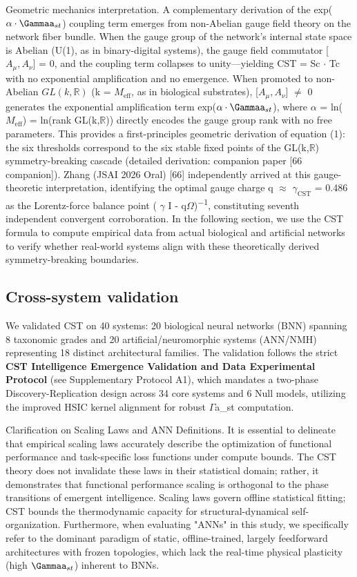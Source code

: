 \documentclass[a4paper,12pt]{article}
\begin{document}
Geometric mechanics interpretation.
A complementary derivation of the exp($\alpha \cdot \Gammaa_{st}$) coupling term emerges from non-Abelian gauge field theory on the network fiber bundle.
When the gauge group of the network's internal state space is Abelian (U(1), as in binary-digital systems), the gauge field commutator [$A_{\mu}, A_{\nu}$] = 0, and the coupling term collapses to unity---yielding CST = Sc $\cdot$ Tc with no exponential amplification and no emergence.
When promoted to non-Abelian $GL(k, \mathbb{R})$ (k = $M_{\text{eff}}$, as in biological substrates), [$A_{\mu}, A_{\nu}$]  $\neq$  0 generates the exponential amplification term exp($\alpha \cdot \Gammaa_{st}$), where  $\alpha$  = ln($M_{\text{eff}}$) = ln(rank GL(k,$\mathbb{R}$)) directly encodes the gauge group rank with no free parameters.
This provides a first-principles geometric derivation of equation (1): the six thresholds correspond to the six stable fixed points of the GL(k,$\mathbb{R}$) symmetry-breaking cascade (detailed derivation: companion paper [66 companion]).
Zhang (JSAI 2026 Oral) [66] independently arrived at this gauge-theoretic interpretation, identifying the optimal gauge charge q  $\approx$  $\gamma_{\text{CST}}$ = 0.486 as the Lorentz-force balance point ( $\gamma$ I - q$\Omega$)\textsuperscript{$-$}\textsuperscript{1}, constituting seventh independent convergent corroboration.
In the following section, we use the CST formula to compute empirical data from actual biological and artificial networks to verify whether real-world systems align with these theoretically derived symmetry-breaking boundaries.

\subsection{Cross-system validation}

We validated CST on 40 systems: 20 biological neural networks (BNN) spanning 8 taxonomic grades and 20 artificial/neuromorphic systems (ANN/NMH) representing 18 distinct architectural families.
The validation follows the strict \textbf{CST Intelligence Emergence Validation and Data Experimental Protocol} (see Supplementary Protocol A1), which mandates a two-phase Discovery-Replication design across 34 core systems and 6 Null models, utilizing the improved HSIC kernel alignment for robust $\Gamma$a_{st} computation.

Clarification on Scaling Laws and ANN Definitions.
It is essential to delineate that empirical scaling laws accurately describe the optimization of functional performance and task-specific loss functions under compute bounds.
The CST theory does not invalidate these laws in their statistical domain; rather, it demonstrates that functional performance scaling is orthogonal to the phase transitions of emergent intelligence.
Scaling laws govern offline statistical fitting; CST bounds the thermodynamic capacity for structural-dynamical self-organization.
Furthermore, when evaluating "ANNs" in this study, we specifically refer to the dominant paradigm of static, offline-trained, largely feedforward architectures with frozen topologies, which lack the real-time physical plasticity (high $\Gammaa_{st}$) inherent to BNNs.
\end{document}
